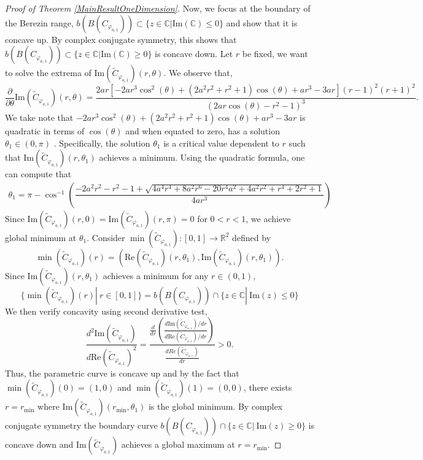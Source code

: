 \documentclass[10pt,a4paper]{amsart}
\begin{document}
\begin{proof}[Proof of Theorem \ref{MainResultOneDimension}]
Now, we focus at the boundary of the Berezin range, $b(B(C_{\varphi_{a,1}})) \subset \{z \in \mathbb{C}|\mathrm{Im}(\mathbb{C}) \leq 0\} $ and show that it is concave up. By complex conjugate symmetry, this shows that $b(B(C_{\varphi_{a,1}})) \subset \{z \in \mathbb{C}|\mathrm{Im}(\mathbb{C}) \geq 0\} $ is concave down. Let $r$ be fixed, we want to solve the extrema of $\mathrm{Im}(\widetilde{C}_{\varphi_{a,1}})(r,\theta)$. 
We observe that, 
\[\dfrac{\partial}{\partial\theta}\mathrm{Im}(\widetilde{C}_{\varphi_{a,1}})(r,\theta)=\dfrac{2ar[-2ar^3\cos^2(\theta)+(2a^2r^2+r^2+1)\cos(\theta)+ar^3-3ar](r-1)^2(r+1)^2}{(2ar\cos(\theta)-r^2-1)^3}.\]
We take note that $-2ar^3\cos^2(\theta)+(2a^2r^2+r^2+1)\cos(\theta)+ar^3-3ar$ is quadratic in terms of $\cos(\theta)$ and when equated to zero, has a solution $\theta_1 \in (0,\pi)$ . Specifically, the solution $\theta_1$ is a critical value  dependent to $r$ such that $\mathrm{Im}(\widetilde{C}_{\varphi_{a,1}})(r,\theta_1)$ achieves a minimum. Using the quadratic formula, one can compute that 
\begin{align}\label{theta_1}
\theta_1 = \pi - \cos^{-1}\left(\dfrac{-2a^2r^2-r^2-1+\sqrt{4a^4r^4+8a^2r^6-20r^4a^2+4a^2r^2+r^4+2r^2+1}}{4ar^3}\right)
\end{align}
Since $\mathrm{Im}(\widetilde{C}_{\varphi_{a,1}})(r,0)=\mathrm{Im}(\widetilde{C}_{\varphi_{a,1}})(r,\pi)=0$ for $0<r<1$, we achieve global minimum at $\theta_1$.
Consider  $\min(\widetilde{C}_{\varphi_{a,1}}): [0,1] \rightarrow \mathbb{R}^2$ defined by 
\[\min(\widetilde{C}_{\varphi_{a,1}})(r)=(\mathrm{Re}(\widetilde{C}_{\varphi_{a,1}})(r,\theta_1),\mathrm{Im}(\widetilde{C}_{\varphi_{a,1}})(r,\theta_1)).\]
Since $\mathrm{Im}(\widetilde{C}_{\varphi_{a,1}})(r,\theta_1)$ achieves a minimum for any $r \in (0,1)$, 
\[\{\min(\widetilde{C}_{\varphi_{a,1}})(r)|\ r \in [0,1]\} = b(B(C_{\varphi_{a,1}})) \cap \{z \in \mathbb{C}|\ \mathrm{Im}(z) \leq 0\} \]
We then verify concavity using second derivative test, 
\[\dfrac{d^2\mathrm{Im}(\widetilde{C}_{\varphi_{a,1}})}{d\mathrm{Re}(\widetilde{C}_{\varphi_{a,1}})^2}=\dfrac{\frac{d}{dr}\left(\frac{d\mathrm{Im}(\widetilde{C}_{\varphi_{a,1}})/dr}{d\mathrm{Re}(\widetilde{C}_{\varphi_{a,1}})/dr}\right)}{\frac{dRe(\widetilde{C}_{\varphi_{a,1}})}{dr}} > 0.\]
Thus, the parametric curve is concave up and by the fact that $\min(\widetilde{C}_{\varphi_{a,1}})(0)=(1,0)$ and $\min(\widetilde{C}_{\varphi_{a,1}})(1)=(0,0)$, there exists $r=r_{\mathrm{min}}$ where $\mathrm{Im}(\widetilde{C}_{\varphi_{a,1}})(r_{\mathrm{min}},\theta_1)$ is the global minimum. By complex conjugate symmetry the boundary curve $b(B(C_{\varphi_{a,1}})) \cap \{z \in \mathbb{C}|\ \mathrm{Im}(z) \geq 0\}$ is concave down and $\mathrm{Im}(\widetilde{C}_{\varphi_{a,1}})$ achieves a global maximum at $r=r_{\mathrm{min}}$.


\end{proof}
\end{document}
